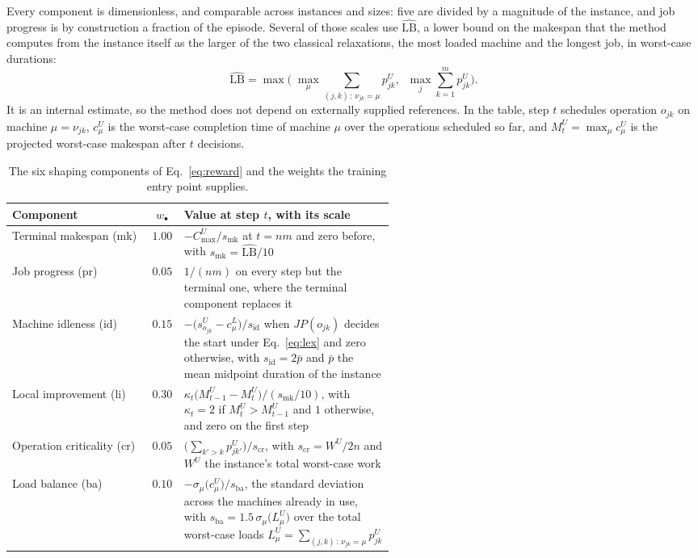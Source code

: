 \documentclass[preprint,authoryear,12pt]{elsarticle}
\newcommand{\LBi}{\widehat{\mathrm{LB}}}
\theoremstyle{definition}
\theoremstyle{remark}
\begin{document}
Every component is dimensionless, and comparable across instances and
sizes: five are divided by a magnitude of the instance, and job
progress is by construction a fraction of the episode. Several of
those scales use $\LBi$, a lower bound on the makespan that the
method computes from the instance itself as the larger of the two
classical relaxations, the most loaded machine and the longest job,
in worst-case durations:
\begin{equation*}
\LBi=\max\Big(\;\max_{\mu}\sum_{(j,k)\,:\,\nu_{jk}=\mu} p^{U}_{jk},
\;\;\max_{j}\sum_{k=1}^{m} p^{U}_{jk}\Big).
\end{equation*}
It is an internal estimate, so the method does not depend on
externally supplied references. In the table, step $t$ schedules
operation $o_{jk}$ on machine $\mu=\nu_{jk}$, $c^{U}_{\mu}$ is the
worst-case completion time of machine $\mu$ over the operations
scheduled so far, and $M^{U}_{t}=\max_{\mu}c^{U}_{\mu}$ is the
projected worst-case makespan after $t$ decisions.

\begin{table}[t]
\centering\small
\caption{The six shaping components of Eq.~\eqref{eq:reward} and the
weights the training entry point supplies.}
\label{tab:reward}
\setlength{\tabcolsep}{4pt}
\renewcommand{\arraystretch}{1.2}
\begin{tabular}{@{}lcp{0.55\linewidth}@{}}
\toprule
Component & $w_{\bullet}$ & Value at step $t$, with its scale \\
\midrule
Terminal makespan (mk) & $1.00$ &
$-C^{U}_{\max}/s_{\mathrm{mk}}$ at $t=nm$ and zero before, with
$s_{\mathrm{mk}}=\LBi/10$ \\
Job progress (pr) & $0.05$ &
$1/(nm)$ on every step but the terminal one, where the terminal
component replaces it \\
Machine idleness (id) & $0.15$ &
$-\big(s^{U}_{o_{jk}}-c^{L}_{\mu}\big)/s_{\mathrm{id}}$ when
$JP(o_{jk})$ decides the start under Eq.~\eqref{eq:lex} and zero
otherwise, with $s_{\mathrm{id}}=2\bar p$ and $\bar p$ the mean
midpoint duration of the instance \\
Local improvement (li) & $0.30$ &
$\kappa_{t}\big(M^{U}_{t-1}-M^{U}_{t}\big)\big/(s_{\mathrm{mk}}/10)$,
with $\kappa_{t}=2$ if $M^{U}_{t}>M^{U}_{t-1}$ and $1$ otherwise,
and zero on the first step \\
Operation criticality (cr) & $0.05$ &
$\big(\sum_{k'>k}p^{U}_{jk'}\big)/s_{\mathrm{cr}}$, with
$s_{\mathrm{cr}}=W^{U}/2n$ and $W^{U}$ the instance's total
worst-case work \\
Load balance (ba) & $0.10$ &
$-\sigma_{\mu}\big(c^{U}_{\mu}\big)/s_{\mathrm{ba}}$, the standard
deviation across the machines already in use, with
$s_{\mathrm{ba}}=1.5\,\sigma_{\mu}\big(L^{U}_{\mu}\big)$ over the
total worst-case loads
$L^{U}_{\mu}=\sum_{(j,k)\,:\,\nu_{jk}=\mu}p^{U}_{jk}$ \\
\bottomrule
\end{tabular}
\end{table}
\end{document}
